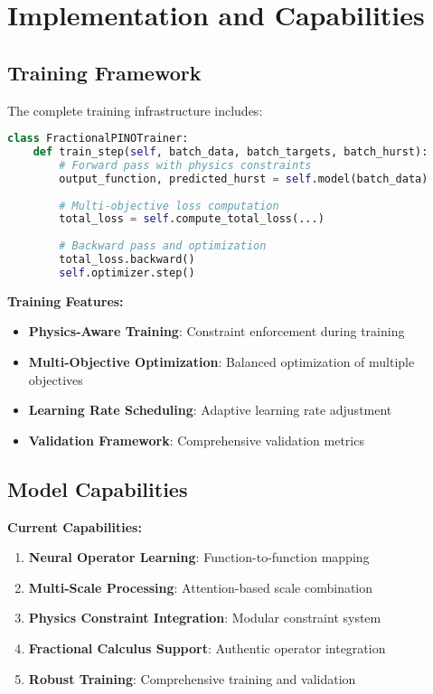 \documentclass[11pt,a4paper]{article}
\begin{document}
\section{Implementation and Capabilities}

\subsection{Training Framework}

The complete training infrastructure includes:

\begin{lstlisting}[language=Python, caption=Training Step Implementation]
class FractionalPINOTrainer:
    def train_step(self, batch_data, batch_targets, batch_hurst):
        # Forward pass with physics constraints
        output_function, predicted_hurst = self.model(batch_data)
        
        # Multi-objective loss computation
        total_loss = self.compute_total_loss(...)
        
        # Backward pass and optimization
        total_loss.backward()
        self.optimizer.step()
\end{lstlisting}

\textbf{Training Features:}
\begin{itemize}
    \item \textbf{Physics-Aware Training}: Constraint enforcement during training
    \item \textbf{Multi-Objective Optimization}: Balanced optimization of multiple objectives
    \item \textbf{Learning Rate Scheduling}: Adaptive learning rate adjustment
    \item \textbf{Validation Framework}: Comprehensive validation metrics
\end{itemize}

\subsection{Model Capabilities}

\textbf{Current Capabilities:}
\begin{enumerate}
    \item \textbf{Neural Operator Learning}: Function-to-function mapping
    \item \textbf{Multi-Scale Processing}: Attention-based scale combination
    \item \textbf{Physics Constraint Integration}: Modular constraint system
    \item \textbf{Fractional Calculus Support}: Authentic operator integration
    \item \textbf{Robust Training}: Comprehensive training and validation
\end{enumerate}
\end{document}
